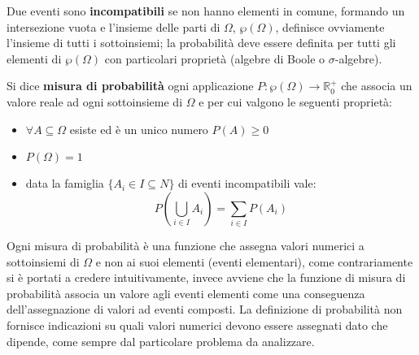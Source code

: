 \documentclass[a4paper,12pt, oneside]{book}
\newcommand{\numberset}{\mathbb}
\newcommand{\R}{\numberset{R}}
\begin{document}
Due eventi sono \textbf{incompatibili} se non hanno elementi in comune, formando un intersezione vuota
e l'insieme delle parti di $\Omega$, $\wp(\Omega)$, definisce ovviamente l'insieme di tutti i sottoinsiemi;
la probabilità deve essere definita per tutti gli elementi di $\wp(\Omega)$ con particolari proprietà (algebre di Boole o $\sigma$-algebre).

Si dice \textbf{misura di probabilità} ogni applicazione $P: \wp(\Omega) \to \R_0 ^ +$
che associa un valore reale ad ogni sottoinsieme di $\Omega$ e per cui valgono le seguenti proprietà:
\begin{itemize}
        \item $\forall A \subseteq \Omega$ esiste ed è un unico numero $P(A) \geq 0$

        \item $P(\Omega) = 1$ 
        \item data la famiglia $\{A_i\in I\subseteq N\}$ di eventi incompatibili vale:
                \[ P\left(\bigcup_{i\in I}A_i\right) = \sum_{i\in I} P(A_i) \]
\end{itemize}
Ogni misura di probabilità è una funzione che assegna valori numerici a sottoinsiemi di $\Omega$
e non ai suoi elementi (eventi elementari), come contrariamente si è portati a credere intuitivamente,
invece avviene che la funzione di misura di probabilità associa un valore agli eventi elementi 
come una conseguenza dell'assegnazione di valori ad eventi composti.\newline
La definizione di probabilità non fornisce indicazioni su quali valori numerici devono essere assegnati dato che dipende,
come sempre dal particolare problema da analizzare.
\end{document}
